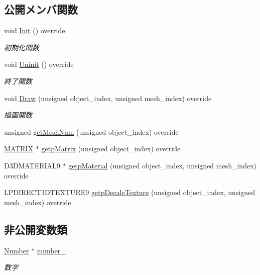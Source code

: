 \subsection*{公開メンバ関数}
\begin{DoxyCompactItemize}
\item 
void \mbox{\hyperlink{class_number_draw_ad52c1e8b9ae6e830a82c440cc18cb6c9}{Init}} () override
\begin{DoxyCompactList}\small\item\em 初期化関数 \end{DoxyCompactList}\item 
void \mbox{\hyperlink{class_number_draw_a2b203d101f23f0d3f584937ff5ad662a}{Uninit}} () override
\begin{DoxyCompactList}\small\item\em 終了関数 \end{DoxyCompactList}\item 
void \mbox{\hyperlink{class_number_draw_a15e4e602b3f9372349d0b6ff9e4fc423}{Draw}} (unsigned object\+\_\+index, unsigned mesh\+\_\+index) override
\begin{DoxyCompactList}\small\item\em 描画関数 \end{DoxyCompactList}\item 
unsigned \mbox{\hyperlink{class_number_draw_abcd88040b2b6d5dd7d21e8cfd50b1682}{get\+Mesh\+Num}} (unsigned object\+\_\+index) override
\item 
\mbox{\hyperlink{_vector3_d_8h_a032295cd9fb1b711757c90667278e744}{M\+A\+T\+R\+IX}} $\ast$ \mbox{\hyperlink{class_number_draw_a2ea44b362c3a018faf46905d0f755410}{getp\+Matrix}} (unsigned object\+\_\+index) override
\item 
D3\+D\+M\+A\+T\+E\+R\+I\+A\+L9 $\ast$ \mbox{\hyperlink{class_number_draw_a4e1a672907ee288fc0c2c6caecdf3904}{getp\+Material}} (unsigned object\+\_\+index, unsigned mesh\+\_\+index) override
\item 
L\+P\+D\+I\+R\+E\+C\+T3\+D\+T\+E\+X\+T\+U\+R\+E9 \mbox{\hyperlink{class_number_draw_a77d155c00ac4637154e62904556de05a}{getp\+Decale\+Texture}} (unsigned object\+\_\+index, unsigned mesh\+\_\+index) override
\end{DoxyCompactItemize}
\subsection*{非公開変数類}
\begin{DoxyCompactItemize}
\item 
\mbox{\hyperlink{class_number}{Number}} $\ast$ \mbox{\hyperlink{class_number_draw_a8063f58804542a7f86b341eec4cc1e60}{number\+\_\+}}
\begin{DoxyCompactList}\small\item\em 数字 \end{DoxyCompactList}\end{DoxyCompactItemize}


